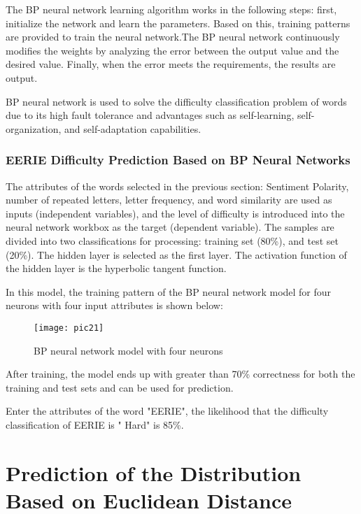 \documentclass[12pt]{article}  %
\begin{document}
The BP neural network learning algorithm works in the following steps: first, initialize the network and learn the parameters. Based on this, training patterns are provided to train the neural network.The BP neural network continuously modifies the weights by analyzing the error between the output value and the desired value. Finally, when the error meets the requirements, the results are output.

BP neural network is used to solve the difficulty classification problem of words due to its high fault tolerance and advantages such as self-learning, self-organization, and self-adaptation capabilities.

\subsubsection{EERIE Difficulty Prediction Based on BP Neural Networks}
The attributes of the words selected in the previous section: Sentiment Polarity, number of repeated letters, letter frequency, and word similarity are used as inputs (independent variables), and the level of difficulty is introduced into the neural network workbox as the target (dependent variable). The samples are divided into two classifications for processing: training set (80\%), and test set (20\%). The hidden layer is selected as the first layer. The activation function of the hidden layer is the hyperbolic tangent function.

In this model, the training pattern of the BP neural network model for four neurons with four input attributes is shown below:

\begin{figure}[htbp]  %
	\centering  %
	\texttt{[image: pic21]} %
	\caption{BP neural network model with four neurons}  
	\label{pic21}
\end{figure}

After training, the model ends up with greater than 70\% correctness for both the training and test sets and can be used for prediction.

Enter the attributes of the word "EERIE", the likelihood that the difficulty classification of EERIE is " Hard" is 85\%.

\section{Prediction of the Distribution Based on Euclidean Distance}
\end{document}
